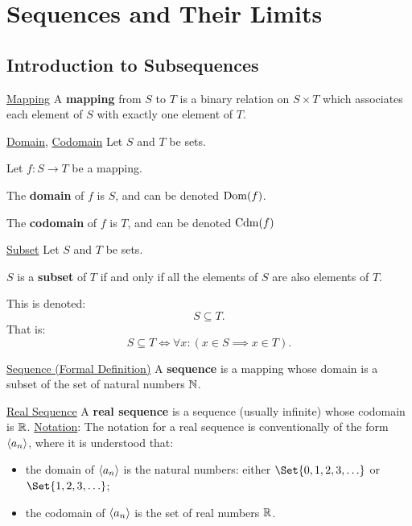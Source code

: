 \section{Sequences and Their Limits}
\subsection{Introduction to Subsequences}
\begin{Definition}{\href{https://proofwiki.org/wiki/Definition:Mapping\#Definition_1}{Mapping}}{}
    A \textbf{mapping} from $ S $ to $ T $ is a binary relation
    on $ S\times T $ which associates each element of $ S $ with exactly one element of $ T $.
\end{Definition}
\begin{Definition}{
        \href{https://proofwiki.org/wiki/Definition:Domain_(Relation_Theory)/Mapping}{Domain},
        \href{https://proofwiki.org/wiki/Definition:Codomain_(Relation_Theory)/Mapping}{Codomain}
    }{}
    Let $ S $ and $ T $ be sets.\smallskip

    Let $ f\colon S\to T $ be a mapping.\bigskip

    The \textbf{domain} of $ f $ is $ S $, and can be denoted $ \operatorname{Dom}(f) $.\smallskip

    The \textbf{codomain} of $ f $ is $ T $, and can be denoted $ \operatorname{Cdm}(f) $
\end{Definition}
\begin{Definition}{\href{https://proofwiki.org/wiki/Definition:Subset}{Subset}}{}
    Let $ S $ and $ T $ be sets.\bigskip

    $ S $ is a \textbf{subset} of $ T $ if and only if all the elements of $ S $ are also elements of $ T $.\smallskip

    This is denoted:
    \[ S\subseteq T. \]
    That is:
    \[ S\subseteq T\iff \forall x:(x\in S\implies x\in T). \]
\end{Definition}
\begin{Definition}{\href{https://proofwiki.org/wiki/Definition:Sequence\#Formal_Definition}{Sequence (Formal Definition)}}{}
    A \textbf{sequence} is a mapping whose domain is a subset of the set of natural numbers $ \mathbb{N} $.
\end{Definition}
\begin{Definition}{\href{https://proofwiki.org/wiki/Definition:Real_Sequence}{Real Sequence}}{}
    A \textbf{real sequence} is a sequence (usually infinite) whose codomain is $ \mathbb{R} $.
    \tcblower{}
    \underline{Notation}: The notation for a real sequence is conventionally of the form
    $ \langle a_n\rangle $, where it is understood that:
    \begin{itemize}
        \item the domain of $ \langle a_n\rangle $ is the natural numbers: either $ \Set{0,1,2,3,\ldots} $ or $ \Set{1,2,3,\ldots} $;
        \item the codomain of $ \langle a_n\rangle $ is the set of real numbers $ \mathbb{R} $.
    \end{itemize}
\end{Definition}
